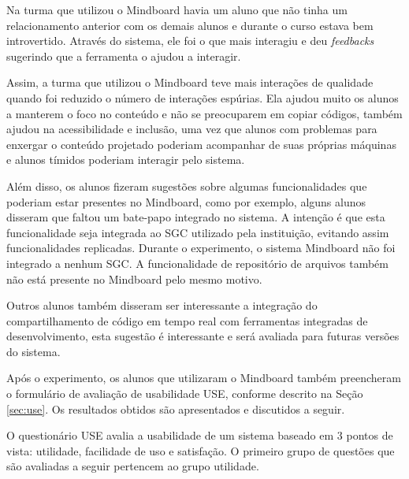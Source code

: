 
Na turma que utilizou o Mindboard havia um aluno que não tinha um relacionamento anterior com os demais alunos e durante o curso estava bem introvertido. Através do sistema, ele foi o que mais interagiu e deu \emph{feedbacks} sugerindo que a ferramenta o ajudou a interagir.

Assim, a turma que utilizou o Mindboard teve mais interações de qualidade quando foi reduzido o número de interações espúrias. Ela ajudou muito os alunos a manterem o foco no conteúdo e não se preocuparem em copiar códigos, também ajudou na acessibilidade e inclusão, uma vez que alunos com problemas para enxergar o conteúdo projetado poderiam acompanhar de suas próprias máquinas e alunos tímidos poderiam interagir pelo sistema.

Além disso, os alunos fizeram sugestões sobre algumas funcionalidades que poderiam estar presentes no Mindboard, como por exemplo, alguns alunos disseram que faltou um bate-papo integrado no sistema. A intenção é que esta funcionalidade seja integrada ao SGC utilizado pela instituição, evitando assim funcionalidades replicadas. Durante o experimento, o sistema Mindboard não foi integrado a nenhum SGC. A funcionalidade de repositório de arquivos também não está presente no Mindboard pelo mesmo motivo.

Outros alunos também disseram ser interessante a integração do compartilhamento de código em tempo real com ferramentas integradas de desenvolvimento, esta sugestão é interessante e será avaliada para futuras versões do sistema.

Após o experimento, os alunos que utilizaram o Mindboard também preencheram o formulário de avaliação de usabilidade USE, conforme descrito na Seção \ref{sec:use}. Os resultados obtidos são apresentados e discutidos a seguir.

O questionário USE avalia a usabilidade de um sistema baseado em 3 pontos de vista: utilidade, facilidade de uso e satisfação. O primeiro grupo de questões que são avaliadas a seguir pertencem ao grupo utilidade. 


